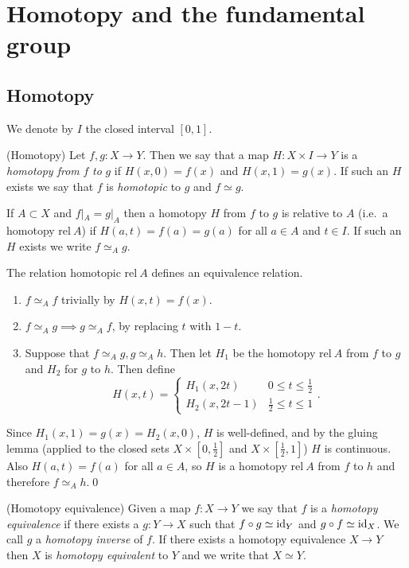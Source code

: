 \documentclass{article}
\newcommand{\rel}{\mathrm{rel}\:}
\begin{document}
 \section{Homotopy and the fundamental group}
 \subsection{Homotopy}
 \begin{definition}
	 We denote by $ I $ the closed interval $ [0,1] $.
 \end{definition}
 \begin{definition}
	 (Homotopy) Let $ f,g:X\to Y $. Then we say that a map $ H: X\times I \to Y $ is a \textit{homotopy from} $ f $ \textit{to} $ g $ if $ H(x,0) = f(x) $ and $ H(x,1)=g(x) $. If such an $ H $ exists we say that $ f $ is \textit{homotopic} to $ g $ and $ f\simeq g $.
 \end{definition}
If $ A\subset X $ and $ f|_A = g|_A $ then a homotopy $ H $ from $ f $ to $ g $ is relative to $ A $ (i.e.\ a homotopy $ \rel A $) if $ H(a,t) = f(a) = g(a) $ for all $ a\in A $ and $ t\in I $. If such an $ H $ exists we write $ f\simeq_A g $.
\begin{proposition}
  The relation homotopic $ \rel A $ defines an equivalence relation.
\end{proposition}
\pf
\begin{enumerate}
	\item $ f\simeq_A f $ trivially by $ H(x,t) = f(x) $.
	\item $ f\simeq_A g \implies g\simeq_A f $, by replacing $ t $ with $ 1-t $.
	\item Suppose that $ f\simeq_A g, g\simeq_A h $. Then let $ H_1 $ be the homotopy $ \rel A $ from $ f $ to $ g $ and $ H_2 $ for $ g $ to $ h $. Then define
		\[H(x,t) =
		  \begin{cases}
			  H_1(x,2t) & 0 \le t \le \frac 12 \\
			  H_2(x,2t-1) & \frac 12 \le t \le 1
		  \end{cases}.
		\]
\end{enumerate}
Since $ H_1(x,1) = g(x) = H_2(x,0) $, $ H $ is well-defined, and by the gluing lemma (applied to the closed sets $ X\times[0,\frac12] $ and $ X\times[\frac12,1] $) $ H $ is continuous. Also $ H(a,t) = f(a) $ for all $ a\in A $, so $ H $ is a homotopy $ \rel A $ from $ f $ to $ h $ and therefore $ f\simeq_A h $.\qed
\begin{definition}
	(Homotopy equivalence) Given a map $ f:X\to Y $ we say that $ f $ is a \textit{homotopy equivalence} if there exists a $ g: Y\to X $ such that $ f\circ g \simeq \mathrm{id}_Y $ and $ g \circ f \simeq \mathrm{id}_X $. We call $ g $ a \textit{homotopy inverse} of $ f $. If there exists a homotopy equivalence $ X\to Y $ then $ X $ is \textit{homotopy equivalent} to $ Y $ and we write that $ X\simeq Y $.
\end{definition}
\end{document}
